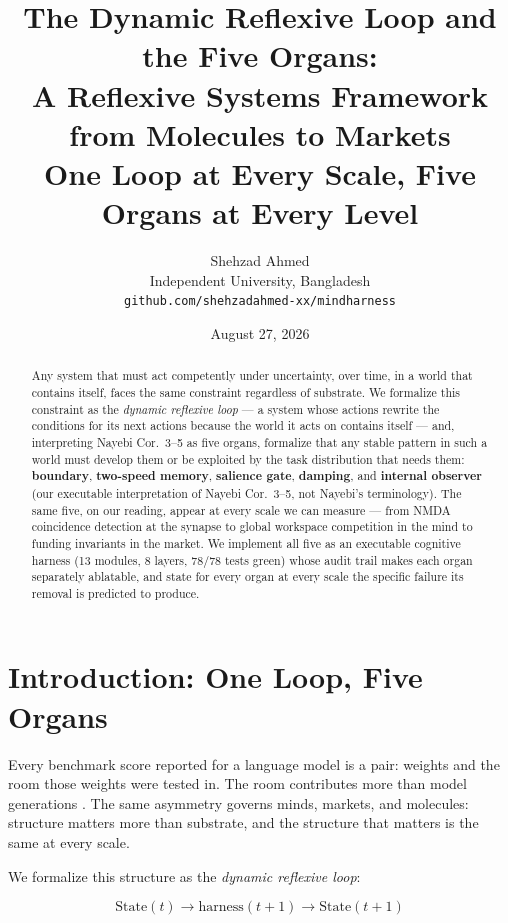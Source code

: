 \documentclass[11pt]{article}
\title{The Dynamic Reflexive Loop and the Five Organs:\\[4pt]
\Large A Reflexive Systems Framework from Molecules to Markets\\[6pt]
\normalsize One Loop at Every Scale, Five Organs at Every Level}
\author{Shehzad Ahmed \\ \small Independent University, Bangladesh \\ \small \texttt{github.com/\allowbreak{}shehzadahmed-\allowbreak{}xx/\allowbreak{}mindharness}}
\date{August 27, 2026}
\begin{document}
\maketitle

\begin{abstract}
Any system that must act competently under uncertainty, over time, in a world that contains itself, faces the same constraint regardless of substrate. We formalize this constraint as the \emph{dynamic reflexive loop} --- a system whose actions rewrite the conditions for its next actions because the world it acts on contains itself --- and, interpreting Nayebi Cor.~3--5 as five organs, formalize that any stable pattern in such a world must develop them or be exploited by the task distribution that needs them: \textbf{boundary}, \textbf{two-speed memory}, \textbf{salience gate}, \textbf{damping}, and \textbf{internal observer} (our executable interpretation of Nayebi Cor.~3--5, not Nayebi's terminology). The same five, on our reading, appear at every scale we can measure --- from NMDA coincidence detection at the synapse to global workspace competition in the mind to funding invariants in the market. We implement all five as an executable cognitive harness (13 modules, 8 layers, 78/78 tests green) whose audit trail makes each organ separately ablatable, and state for every organ at every scale the specific failure its removal is predicted to produce.
\end{abstract}

\section{Introduction: One Loop, Five Organs}

Every benchmark score reported for a language model is a pair: weights and the room those weights were tested in. The room contributes more than model generations \citep{lin2026ahe}. The same asymmetry governs minds, markets, and molecules: structure matters more than substrate, and the structure that matters is the same at every scale.

We formalize this structure as the \emph{dynamic reflexive loop}:

\begin{equation}
\mathrm{State}(t) \to \mathrm{harness}(t{+}1) \to \mathrm{State}(t{+}1)
\end{equation}
\end{document}
